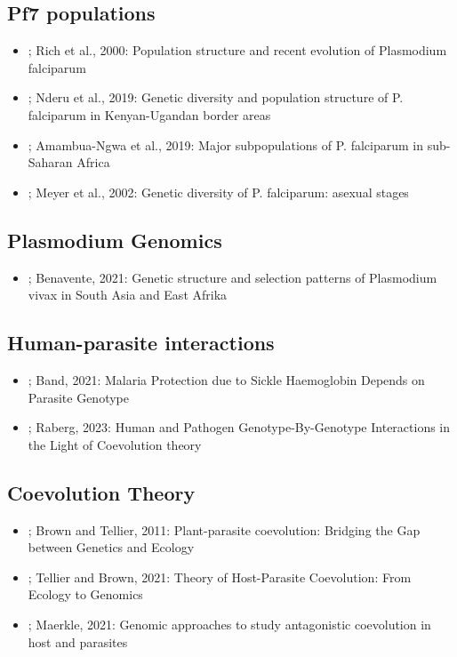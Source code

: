 \documentclass[11pt]{article}
\begin{document}
\subsection{Pf7 populations}
\label{sec:org7cc5de0}
\begin{itemize}
\item \cite{rich-2000-popul-struc}; Rich et al., 2000: Population structure and recent evolution of Plasmodium falciparum
\item \cite{nderu-2019-genet-diver}; Nderu et al., 2019: Genetic diversity and population structure of P. falciparum in Kenyan-Ugandan border areas
\item \cite{amambua-ngwa-2019-major-subpop}; Amambua-Ngwa et al., 2019: Major subpopulations of P. falciparum in sub-Saharan Africa
\item \cite{meyer-2002-review}; Meyer et al., 2002: Genetic diversity of P. falciparum: asexual stages
\end{itemize}

\subsection{Plasmodium Genomics}
\label{sec:org620d310}
\begin{itemize}
\item \cite{benavente-2021-distin-genet}; Benavente, 2021: Genetic structure and selection patterns of Plasmodium vivax in South Asia and East Afrika
\end{itemize}

\subsection{Human-parasite interactions}
\label{sec:org45099fe}
\begin{itemize}
\item \cite{band-2021-malar-protec}; Band, 2021: Malaria Protection due to Sickle Haemoglobin Depends on Parasite Genotype
\item \cite{raberg-2023-human-pathog}; Raberg, 2023: Human and Pathogen Genotype-By-Genotype Interactions in the Light of Coevolution theory
\end{itemize}

\subsection{Coevolution Theory}
\label{sec:org9cc0997}
\begin{itemize}
\item \cite{brown-2011-plant-paras-coevol}; Brown and Tellier, 2011: Plant-parasite coevolution: Bridging the Gap between Genetics and Ecology
\item \cite{tellier-2021-theor-host}; Tellier and Brown, 2021: Theory of Host-Parasite Coevolution: From Ecology to Genomics
\item \cite{maerkle-2021-novel-genom}; Maerkle, 2021: Genomic approaches to study antagonistic coevolution in host and parasites
\end{itemize}
\end{document}
